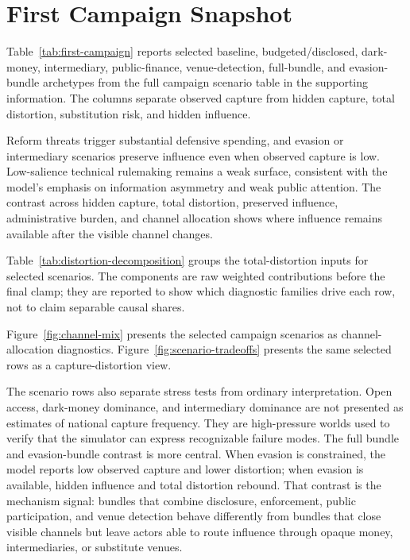 \section{First Campaign Snapshot}

Table~\ref{tab:first-campaign} reports selected baseline, budgeted/disclosed, dark-money, intermediary, public-finance, venue-detection, full-bundle, and evasion-bundle archetypes from the full campaign scenario table in the supporting information. The columns separate observed capture from hidden capture, total distortion, substitution risk, and hidden influence.



Reform threats trigger substantial defensive spending, and evasion or intermediary scenarios preserve influence even when observed capture is low. Low-salience technical rulemaking remains a weak surface, consistent with the model's emphasis on information asymmetry and weak public attention. The contrast across hidden capture, total distortion, preserved influence, administrative burden, and channel allocation shows where influence remains available after the visible channel changes.

Table~\ref{tab:distortion-decomposition} groups the total-distortion inputs for selected scenarios. The components are raw weighted contributions before the final clamp; they are reported to show which diagnostic families drive each row, not to claim separable causal shares.



Figure~\ref{fig:channel-mix} presents the selected campaign scenarios as channel-allocation diagnostics. Figure~\ref{fig:scenario-tradeoffs} presents the same selected rows as a capture-distortion view.





The scenario rows also separate stress tests from ordinary interpretation. Open access, dark-money dominance, and intermediary dominance are not presented as estimates of national capture frequency. They are high-pressure worlds used to verify that the simulator can express recognizable failure modes. The full bundle and evasion-bundle contrast is more central. When evasion is constrained, the model reports low observed capture and lower distortion; when evasion is available, hidden influence and total distortion rebound. That contrast is the mechanism signal: bundles that combine disclosure, enforcement, public participation, and venue detection behave differently from bundles that close visible channels but leave actors able to route influence through opaque money, intermediaries, or substitute venues.


